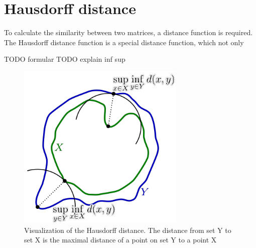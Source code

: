 \section{Hausdorff distance}
\label{hausdorff_distance_chapter}



To calculate the similarity between two matrices, a distance function is required. The Hausdorff distance function is a special distance function,
which not only 

TODO formular
TODO explain inf sup

\begin{figure}[H]
\centering
\includegraphics[width=8cm]{chapters/06_hdm/images/hausdorff_distance.png}
\caption{Visualization of the Hausdorff distance. The distance from set Y to set X is the maximal distance of a point on set Y to a point X \cite{hausdorffdistanceimage}}
\label{hausdorff_distance}
\end{figure}

